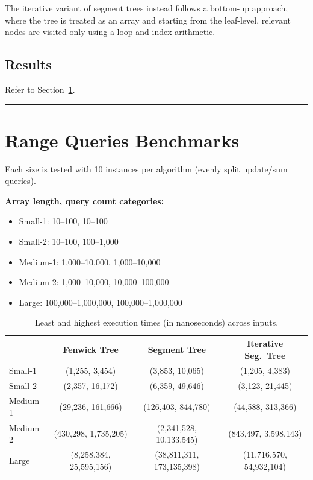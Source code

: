 \documentclass[12pt]{article}
\begin{document}
The iterative variant\cite{iterative_segment_tree} of segment trees instead follows a bottom-up approach, where the tree is treated as an array and starting from the leaf-level, relevant nodes are visited only using a loop and index arithmetic.

\subsection{Results}
Refer to Section~\ref{sec:range-queries-benchmarks}.

\bigskip
\hrule height 1pt
\bigskip

\section{Range Queries Benchmarks}\label{sec:range-queries-benchmarks}

Each size is tested with 10 instances per algorithm (evenly split update/sum queries).

\textbf{Array length, query count categories:}
\begin{itemize}
  \item Small-1: 10–100, 10–100
  \item Small-2: 10–100, 100–1{,}000
  \item Medium-1: 1{,}000–10{,}000, 1{,}000–10{,}000
  \item Medium-2: 1{,}000–10{,}000, 10{,}000–100{,}000
  \item Large: 100{,}000–1{,}000{,}000, 100{,}000–1{,}000{,}000
\end{itemize}

\begin{table}[H]
  \centering
  \begin{tabular}{@{}lccc@{}}
    \toprule
               & \textbf{Fenwick Tree}   & \textbf{Segment Tree}    & \textbf{Iterative Seg.\ Tree} \\ \midrule
    Small-1   & (1{,}255, 3{,}454)      & (3{,}853, 10{,}065)      & (1{,}205, 4{,}383)           \\
    Small-2   & (2{,}357, 16{,}172)     & (6{,}359, 49{,}646)      & (3{,}123, 21{,}445)          \\
    Medium-1  & (29{,}236, 161{,}666)   & (126{,}403, 844{,}780)   & (44{,}588, 313{,}366)        \\
    Medium-2  & (430{,}298, 1{,}735{,}205) & (2{,}341{,}528, 10{,}133{,}545) & (843{,}497, 3{,}598{,}143) \\
    Large     & (8{,}258{,}384, 25{,}595{,}156) & (38{,}811{,}311, 173{,}135{,}398) & (11{,}716{,}570, 54{,}932{,}104) \\
    \bottomrule
  \end{tabular}
  \caption{Least and highest execution times (in nanoseconds) across inputs.}
\end{table}
\end{document}
